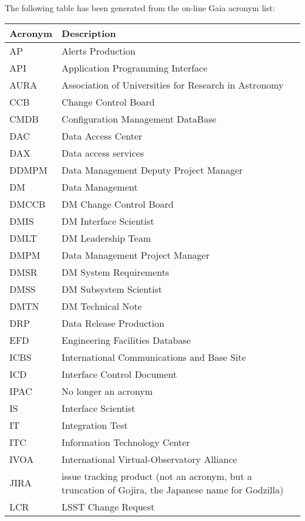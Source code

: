 The following table has been generated from the on-line Gaia acronym list:
\newline\newline%
\addtocounter{table}{-1}
\begin{longtable}{|l|p{}|}\hline 
\textbf{Acronym} & \textbf{Description}  \\\hline
AP&Alerts Production \\\hline
API&Application Programming Interface \\\hline
AURA&Association of Universities for Research in Astronomy \\\hline
CCB&Change Control Board \\\hline
CMDB&Configuration Management DataBase \\\hline
DAC&Data Access Center \\\hline
DAX&Data access services \\\hline
DDMPM&Data Management Deputy Project Manager \\\hline
DM&Data Management \\\hline
DMCCB&DM Change Control Board \\\hline
DMIS&DM Interface Scientist \\\hline
DMLT&DM Leadership Team \\\hline
DMPM&Data Management Project Manager \\\hline
DMSR&DM System Requirements \\\hline
DMSS&DM Subsystem Scientist \\\hline
DMTN&DM Technical Note \\\hline
DRP&Data Release Production \\\hline
EFD&Engineering Facilities Database \\\hline
ICBS&International Communications and Base Site \\\hline
ICD&Interface Control Document \\\hline
IPAC&No longer an acronym \\\hline
IS&Interface Scientist \\\hline
IT&Integration Test \\\hline
ITC&Information Technology Center \\\hline
IVOA&International Virtual-Observatory Alliance \\\hline
JIRA&issue tracking product (not an acronym, but a truncation of Gojira, the Japanese name for Godzilla) \\\hline
LCR&LSST Change Request \\\hline

\end{longtable}
